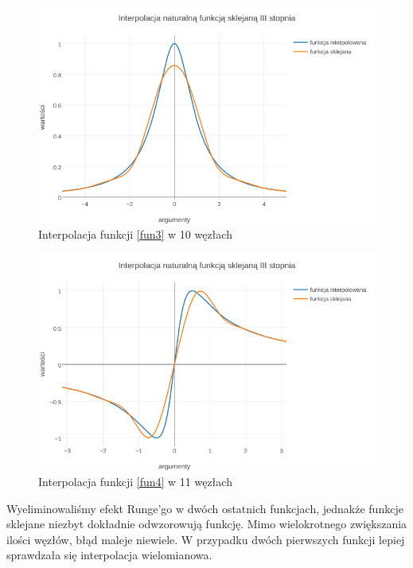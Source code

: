 \documentclass{article}
\begin{document}
\begin{figure}[ht]
	\begin{center}
		\includegraphics[width=13cm]{spline_c}
	\end{center}
	\caption{Interpolacja funkcji \eqref{fun3} w 10 węzłach}
	\label{fig:rysunek3}
\end{figure}

\begin{figure}[ht]
	\begin{center}
		\includegraphics[width=13cm]{spline_d}
	\end{center}
	\caption{Interpolacja funkcji \eqref{fun4} w 11 węzłach}
	\label{fig:rysunek4}
\end{figure}


Wyeliminowaliśmy efekt Runge'go w dwóch ostatnich funkcjach, jednakże funkcje sklejane niezbyt dokładnie odwzorowują funkcję. Mimo wielokrotnego zwiększania ilości węzłów, błąd maleje niewiele. W przypadku dwóch pierwszych funkcji lepiej sprawdzała się interpolacja wielomianowa.
	
\end{document}
